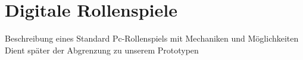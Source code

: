 \section{Digitale Rollenspiele}
\label{sec:DigitaleRollenspiele}

Beschreibung eines Standard Pc-Rollenspiels mit Mechaniken und Möglichkeiten\newline
Dient später der Abgrenzung zu unserem Prototypen